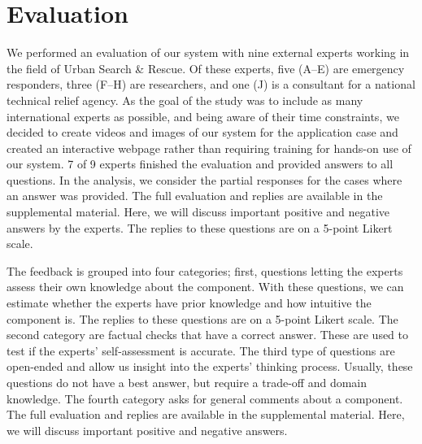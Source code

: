 \documentclass{egpubl}
\begin{document}
\section{Evaluation} \label{sec:evaluation}
We performed an evaluation of our system with nine external experts working in the field of Urban Search \& Rescue. Of these experts, five (A--E) are emergency responders, three (F--H) are researchers, and one (J) is a consultant for a national technical relief agency. As the goal of the study was to include as many international experts as possible, and being aware of their time constraints, we decided to create videos and images of our system for the application case and created an interactive webpage rather than requiring training for hands-on use of our system. 7 of 9 experts finished the evaluation and provided answers to all questions. In the analysis, we consider the partial responses for the cases where an answer was provided. The full evaluation and replies are available in the supplemental material. Here, we will discuss important positive and negative answers by the experts. The replies to these questions are on a 5-point Likert scale.

The feedback is grouped into four categories; first, questions letting the experts assess their own knowledge about the component. With these questions, we can estimate whether the experts have prior knowledge and how intuitive the component is. The replies to these questions are on a 5-point Likert scale. The second category are factual checks that have a correct answer. These are used to test if the experts' self-assessment is accurate. The third type of questions are open-ended and allow us insight into the experts' thinking process. Usually, these questions do not have a best answer, but require a trade-off and domain knowledge. The fourth category asks for general comments about a component. The full evaluation and replies are available in the supplemental material. Here, we will discuss important positive and negative answers. 
\end{document}

